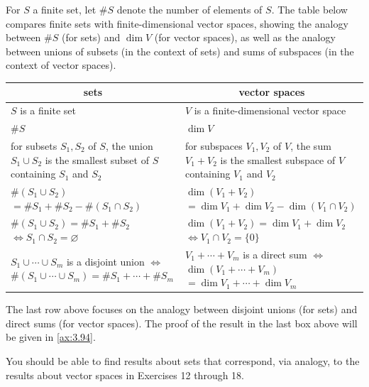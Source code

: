 For $S$ a finite set, let $\#S$ denote the number of elements of $S$. The table
below compares finite sets with finite-dimensional vector spaces, showing the
analogy between $\#S$ (for sets) and $\dim V$ (for vector spaces), as well as
the analogy between unions of subsets (in the context of sets) and sums of
subspaces (in the context of vector spaces).

\begin{center}\small
\begin{tabular}{|p{.44\linewidth}|p{.44\linewidth}|}
\hline
\multicolumn{1}{|c|}{\textbf{sets}} &
\multicolumn{1}{c|}{\textbf{vector spaces}}\\
\hline
$S$ is a finite set & $V$ is a finite-dimensional vector space\\
\hline
$\#S$ & $\dim V$\\
\hline
for subsets $S_1,S_2$ of $S$, the union $S_1\cup S_2$ is the smallest subset of
$S$ containing $S_1$ and $S_2$ &
for subspaces $V_1,V_2$ of $V$, the sum $V_1+V_2$ is the smallest subspace of
$V$ containing $V_1$ and $V_2$\\
\hline
$\#(S_1\cup S_2)$\newline $=\#S_1+\#S_2-\#(S_1\cap S_2)$ &
$\dim(V_1+V_2)$\newline $=\dim V_1+\dim V_2-\dim(V_1\cap V_2)$\\
\hline
$\#(S_1\cup S_2)=\#S_1+\#S_2$\newline $\iff S_1\cap S_2=\varnothing$ &
$\dim(V_1+V_2)=\dim V_1+\dim V_2$\newline $\iff V_1\cap V_2=\{0\}$\\
\hline
$S_1\cup\cdots\cup S_m$ is a disjoint union $\iff$\newline
$\#(S_1\cup\cdots\cup S_m)=\#S_1+\cdots+\#S_m$ &
$V_1+\cdots+V_m$ is a direct sum $\iff$\newline
$\dim(V_1+\cdots+V_m)$\newline $=\dim V_1+\cdots+\dim V_m$\\
\hline
\end{tabular}
\end{center}

The last row above focuses on the analogy between disjoint unions (for sets) and
direct sums (for vector spaces). The proof of the result in the last box above
will be given in \ref{ax:3.94}.

You should be able to find results about sets that correspond, via analogy, to
the results about vector spaces in Exercises 12 through 18.

